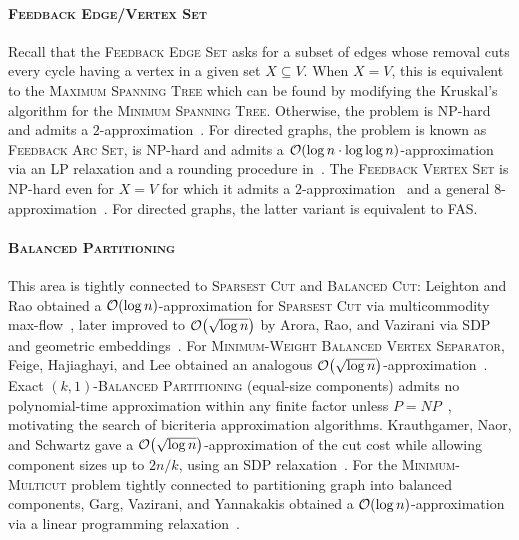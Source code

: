 \paragraph{\textsc{Feedback Edge/Vertex Set}}
Recall that the  \textsc{Feedback Edge Set} asks for a subset of edges whose removal cuts every cycle having a vertex in a given set $X\subseteq V$.
When $X=V$, this is equivalent to the \textsc{Maximum Spanning Tree} which can be found by modifying the Kruskal's algorithm for the \textsc{Minimum Spanning Tree}. Otherwise, the problem is NP-hard and admits a $2$-approximation~\cite{ApproximatingMinimumSubsetFeedbackSetsInUndirectedGraphsWithApplications}.
For directed graphs, the problem is known as \textsc{Feedback Arc Set}, is NP-hard and admits a $\mathcal{O}\mathopen{}\left( \log n \cdot \log\log n \right)$-approximation via an LP relaxation and a rounding procedure in~\cite{ApproximatingMinimumFeedbackSetsAndMulticutsInDirectedGraphs}.
The \textsc{Feedback Vertex Set} is NP-hard even for $X=V$ for which it admits a $2$-approximation~\cite{A2-ApproximationAlgorithmForTheUndirectedFeedbackVertexSetProblem,OptimizationOfPearlsMethod} and a general $8$-approximation~\cite{An8ApproximationAlgorithmForTheSubsetFeedbackVertexSetProblem}. For directed graphs, the latter variant is equivalent to \textsc{FAS}.

\paragraph{\textsc{Balanced Partitioning}}
This area is tightly connected to \textsc{Sparsest Cut} and \textsc{Balanced Cut}: Leighton and Rao obtained a $\mathcal{O}\mathopen{}\left( \log n \right)$-approximation for \textsc{Sparsest Cut} via multicommodity max-flow~\cite{LeightonRao1999}, later improved to $\mathcal{O}\mathopen{}\left( \sqrt{\log n} \right)$ by Arora, Rao, and Vazirani via SDP and geometric embeddings~\cite{ExpanderFlowsGeometricEmbeddingsAndGraphPartitioning}. For \textsc{Minimum-Weight Balanced Vertex Separator}, Feige, Hajiaghayi, and Lee obtained an analogous $\mathcal{O}\mathopen{}\left( \sqrt{\log n} \right)$-approximation~\cite{FeigeHajiaghayiLee2005}. Exact $(k,1)$-\textsc{Balanced Partitioning} (equal-size components) admits no polynomial-time approximation within any finite factor unless $P=NP$~\cite{AndreevRacke2004}, motivating the search of bicriteria approximation algorithms. Krauthgamer, Naor, and Schwartz gave a $\mathcal{O}\mathopen{}\left( \sqrt{\log n} \right)$-approximation of the cut cost while allowing component sizes up to $2n/k$, using an SDP relaxation~\cite{PartitioningGraphsIntoBalancedComponents}. For the \textsc{Minimum-Multicut} problem tightly connected to partitioning graph into balanced components, Garg, Vazirani, and Yannakakis obtained a $\mathcal{O}\mathopen{}\left( \log n \right)$-approximation via a linear programming relaxation~\cite{ApproximateMaxFlowMinMultiCut1993}.
